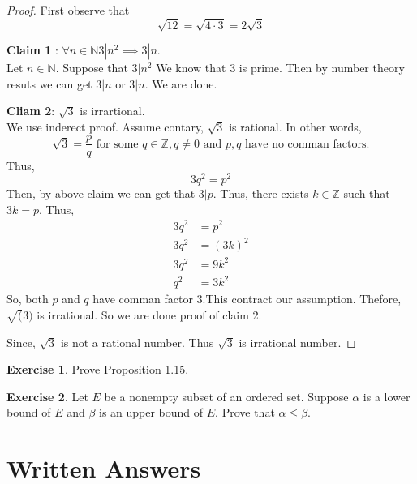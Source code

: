 \documentclass[
]{book}
\theoremstyle{definition}
\theoremstyle{definition}
\theoremstyle{definition}
\newtheorem{exercise}{Exercise}[chapter]
\theoremstyle{definition}
\theoremstyle{remark}
\begin{document}
\begin{proof}
First observe that
\[\sqrt{12}=\sqrt{4\cdot 3}=2\sqrt{3}\]

\textbf{Claim 1} : \(\forall n\in \mathbb{N}3|n^2 \implies 3|n\).\\
Let \(n\in \mathbb{N}\). Suppose that \(3|n^2\) We know that \(3\) is prime. Then by number theory resuts we can get \(3|n\) or \(3|n\).
We are done.

\textbf{Cliam 2}: \(\sqrt{3}\) is irrartional.\\
We use inderect proof. Assume contary, \(\sqrt{3}\) is rational. In other words,
\[\sqrt{3}=\frac{p}{q}\text{  for some } q\in \mathbb{Z} , q\neq 0\text{ and } p,q \text{ have no comman factors.}\]
Thus,\[3q^2=p^2\]
Then, by above claim we can get that \(3|p\). Thus, there exists \(k \in \mathbb{Z}\) such that \(3k=p\).
Thus,
\[
\begin{aligned}
3q^2 &=p^2\\
3q^2 &= (3k)^2\\
3q^2 &= 9k^2\\
q^2  &= 3k^2
\end{aligned}
\]
So, both \(p\) and \(q\) have comman factor 3.This contract our assumption. Thefore, \(\sqrt(3)\) is irrational. So we are done proof of claim 2.

Since, \(\sqrt{3}\) is not a rational number. Thus \(\sqrt{3}\) is irrational number.
\end{proof}

\begin{exercise}
\protect\hypertarget{exr:unnamed-chunk-4}{}\label{exr:unnamed-chunk-4}Prove Proposition 1.15.
\end{exercise}

\begin{exercise}
\protect\hypertarget{exr:unnamed-chunk-5}{}\label{exr:unnamed-chunk-5}Let \(E\) be a nonempty subset of an ordered set. Suppose \(\alpha\) is a lower bound of \(E\) and \(\beta\) is an upper bound of \(E\). Prove that \(\alpha \leq \beta\).
\end{exercise}

\section{Written Answers}\label{written-answers}
\end{document}
